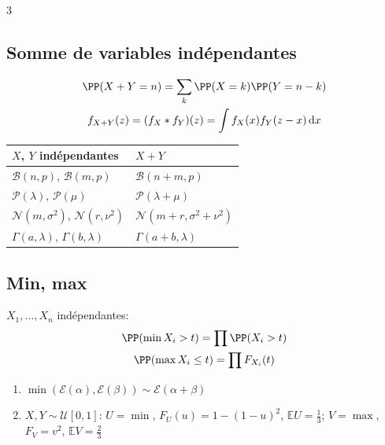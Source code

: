 \documentclass[12pt, a4paper]{article}
\newcommand{\dd}{\mathrm{d}}
\newcommand{\E}{\mathbb{E}}
\begin{document}
\begin{multicols*}{3}
	\subsection{Somme de variables indépendantes}
	\begin{gather*}
		\PP(X+Y=n)=\sum_k\PP(X=k)\PP(Y=n-k)\\
		f_{X+Y}(z)=(f_X*f_Y)(z)=\int f_X(x)f_Y(z-x)\,\dd x
	\end{gather*}
	\begin{tabular}{|l|l|}
		\hline
		$X$, $Y$ indépendantes           & $X+Y$                           \\
		\hline
		$\mathcal B(n,p)$, $\mathcal B(m,p)$ & $\mathcal B(n+m,p)$         \\
		$\mathcal P(\lambda)$, $\mathcal P(\mu)$ & $\mathcal P(\lambda+\mu)$ \\
		$\mathcal N(m,\sigma^2)$, $\mathcal N(r,\nu^2)$ & $\mathcal N(m+r,\sigma^2+\nu^2)$ \\
		$\Gamma(a,\lambda)$, $\Gamma(b,\lambda)$ & $\Gamma(a+b,\lambda)$     \\
		\hline
	\end{tabular}

	\subsection{Min, max}
	$X_1,\dots,X_n$ indépendantes:
	\begin{gather*}
		\PP(\min X_i>t)=\prod\PP(X_i>t)\\ \PP(\max X_i\leq t)=\prod F_{X_i}(t)
	\end{gather*}
	\begin{enumerate}[\roman*.]
		\item $\min(\mathcal E(\alpha),\mathcal E(\beta))\sim\mathcal E(\alpha+\beta)$
		\item $X,Y\sim\mathcal U[0,1]$: $U=\min$, $F_U(u)=1-(1-u)^2$, $\E U=\frac13$; $V=\max$, $F_V=v^2$, $\E V=\frac23$
	\end{enumerate}

	\colbreak

\end{multicols*}
\end{document}
